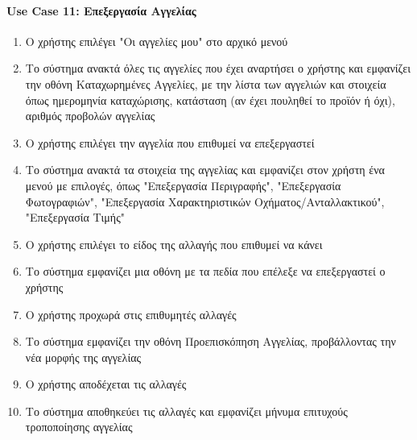 \documentclass{../ol-softwaremanual}
\begin{document}
	
	\paragraph{}
	
	
	\paragraph{\en Use Case 11: \gr Επεξεργασία Αγγελίας \gr}
	
	\begin{enumerate}
		\item Ο χρήστης επιλέγει \en"\gr Οι αγγελίες μου\en" \gr στο αρχικό μενού
		\item Το σύστημα ανακτά όλες τις αγγελίες που έχει αναρτήσει ο χρήστης και εμφανίζει την οθόνη Καταχωρημένες Αγγελίες, με την λίστα των αγγελιών και στοιχεία όπως ημερομηνία καταχώρισης, κατάσταση (αν έχει πουληθεί το προϊόν ή όχι), αριθμός προβολών αγγελίας
		\item Ο χρήστης επιλέγει την αγγελία που επιθυμεί να επεξεργαστεί
		\item Το σύστημα ανακτά τα στοιχεία της αγγελίας και εμφανίζει στον χρήστη ένα μενού με επιλογές, όπως \en"\gr Επεξεργασία Περιγραφής\en"\gr , \en"\gr Επεξεργασία Φωτογραφιών\en"\gr, \en"\gr Επεξεργασία Χαρακτηριστικών Οχήματος/Ανταλλακτικού\en"\gr, \en"\gr Επεξεργασία Τιμής\en"\gr
		\item Ο χρήστης επιλέγει το είδος της αλλαγής που επιθυμεί να κάνει 
		\item Το σύστημα εμφανίζει μια οθόνη με τα πεδία που επέλεξε να επεξεργαστεί ο χρήστης
		\item Ο χρήστης προχωρά στις επιθυμητές αλλαγές
		\item Το σύστημα εμφανίζει την οθόνη Προεπισκόπηση Αγγελίας, προβάλλοντας την νέα μορφής της αγγελίας
		\item Ο χρήστης αποδέχεται τις αλλαγές
		\item Το σύστημα αποθηκεύει τις αλλαγές και εμφανίζει μήνυμα επιτυχούς τροποποίησης αγγελίας
	\end{enumerate}
	
\end{document}
